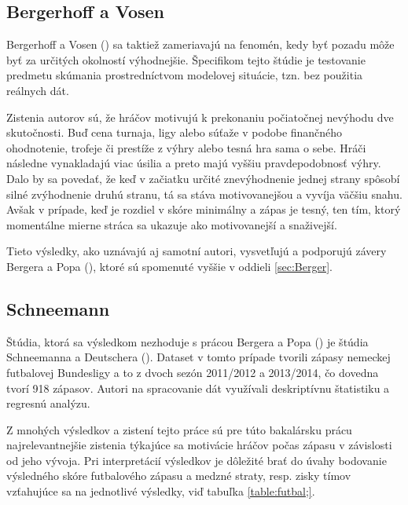 \documentclass[
  digital, %
  twoside, %
  notable,   %
  lof,     %
  lot,     %
]{fithesis3}
\begin{document}
		\subsection{Bergerhoff a Vosen}
		Bergerhoff a Vosen (\citeyear{bergerhoff2015}) sa taktiež zameriavajú na fenomén, kedy byť pozadu môže byť za určitých okolností výhodnejšie. Špecifikom tejto štúdie je testovanie predmetu skúmania prostredníctvom modelovej situácie, tzn. bez použitia reálnych dát.
		
		Zistenia autorov sú, že hráčov motivujú k prekonaniu počiatočnej nevýhodu dve skutočnosti. Buď cena turnaja, ligy alebo súťaže v podobe finančného ohodnotenie, trofeje či prestíže z výhry alebo tesná hra sama o sebe. Hráči následne vynakladajú viac úsilia a preto majú vyššiu pravdepodobnosť výhry. \parencite[s.~20]{bergerhoff2015} Dalo by sa povedať, že keď v začiatku určité znevýhodnenie jednej strany spôsobí silné zvýhodnenie druhú stranu, tá sa stáva motivovanejšou a vyvíja väčšiu snahu. Avšak v prípade, keď je rozdiel v skóre minimálny a zápas je tesný, ten tím, ktorý momentálne mierne stráca sa ukazuje ako motivovanejší a snaživejší.
		
		Tieto výsledky, ako uznávajú aj samotní autori, vysvetľujú a podporujú závery Bergera a Popa (\citeyear{berger2011}), ktoré sú spomenuté vyššie v oddieli \ref{sec:Berger}.
		
		\subsection{Schneemann}
		Štúdia, ktorá sa výsledkom nezhoduje s prácou Bergera a Popa (\citeyear{berger2011}) je štúdia Schneemanna a Deutschera (\citeyear{schneemann2017}). Dataset v tomto prípade tvorili zápasy nemeckej futbalovej Bundesligy a to z dvoch sezón  2011/2012 a 2013/2014, čo dovedna tvorí 918 zápasov. Autori na spracovanie dát využívali deskriptívnu štatistiku a regresnú analýzu.
		
		Z mnohých výsledkov a zistení tejto práce sú pre túto bakalársku prácu najrelevantnejšie zistenia týkajúce sa motivácie hráčov počas zápasu v závislosti od jeho vývoja. Pri interpretácií výsledkov je dôležité brať do úvahy bodovanie výsledného skóre futbalového zápasu a medzné straty, resp. zisky tímov vzťahujúce sa na jednotlivé výsledky, viď tabuľka \ref{table:futbal;}. 
		
\end{document}
